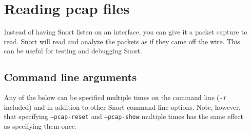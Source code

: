 \documentclass[english]{report}
\begin{document}
\section{Reading pcap files}

Instead of having Snort listen on an interface, you can give it a packet
capture to read.  Snort will read and analyze the packets as if they came off
the wire.  This can be useful for testing and debugging Snort.

\subsection{Command line arguments}

Any of the below can be specified multiple times on the command line
(\texttt{-r} included) and in addition to other Snort command line options.
Note, however, that specifying \texttt{--pcap-reset} and \texttt{--pcap-show}
multiple times has the same effect as specifying them once.
\end{document}
